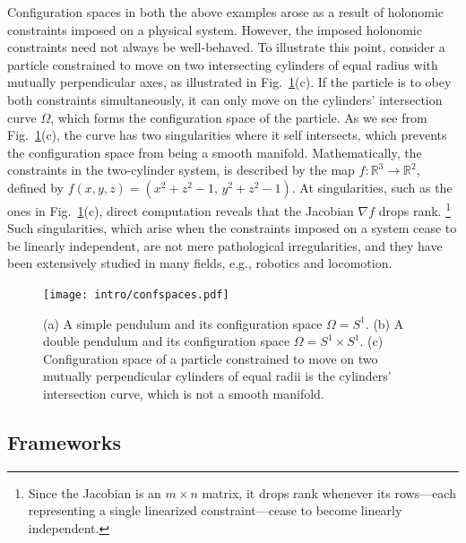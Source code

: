 Configuration spaces in both the above examples arose as a result of holonomic constraints imposed on a physical system.
However, the imposed holonomic constraints need not always be well-behaved.
To illustrate this point, consider a particle constrained to move on two intersecting cylinders of equal radius with mutually perpendicular axes, as illustrated in Fig.~\ref{fig:confspaces}(c).
If the particle is to obey both constraints simultaneously, it can only move on the cylinders' intersection curve $\Omega$, which forms the configuration space of the particle.
As we see from Fig.~\ref{fig:confspaces}(c), the curve has two singularities where it self intersects, which prevents the configuration space from being a smooth manifold.
Mathematically, the constraints in the two-cylinder system, is described by the map $f: \mathbb{R}^{3} \to \mathbb{R}^{2}$, defined by $f(x, y, z) = (x^{2} + z^{2} - 1,\, y^{2} + z^{2} - 1)$.
At singularities, such as the ones in Fig.~\ref{fig:confspaces}(c), direct computation reveals that the Jacobian $\nabla f$ drops rank.%
\footnote{Since the Jacobian is an $m\times n$ matrix, it drops rank whenever its rows---each representing a single linearized constraint---cease to become linearly independent.}
Such singularities, which arise when the constraints imposed on a system cease to be linearly independent, are not mere pathological irregularities, and they have been extensively studied in many fields, e.g., robotics and locomotion.
%
\begin{figure}
  \begin{center}
    \texttt{[image: intro/confspaces.pdf]}
  \end{center}
  \caption{
  (a) A simple pendulum and its configuration space $\Omega = S^{1}$.
  (b) A double pendulum and its configuration space $\Omega = S^{1} \times S^{1}$.
  (c) Configuration space of a particle constrained to move on two mutually perpendicular cylinders of equal radii is the cylinders' intersection curve, which is not a smooth manifold.
  }
  \label{fig:confspaces}
\end{figure}

\subsection{Frameworks}

